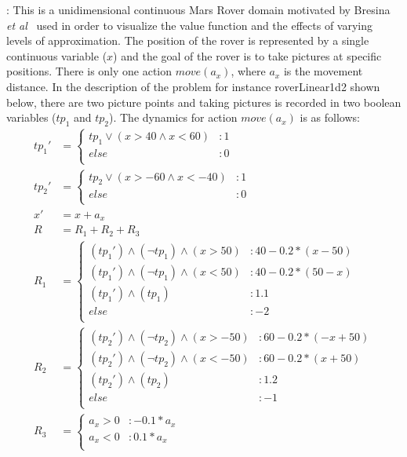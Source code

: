 \MarsRoverUni:
This is a unidimensional continuous Mars Rover domain motivated by
Bresina {\it et al}~\cite{bresina02} used in order to visualize the
value function and the effects of varying levels of approximation.
The position of the rover is represented by a single continuous
variable ($x$) and the goal of the rover is to take pictures at
specific positions.  There is only one action $\mathit{move}(a_x)$,
where $a_x$ is the movement distance. In the description of the
problem for instance roverLinear1d2 shown below, there are two picture
points and taking pictures is recorded in two boolean variables
($tp_1$ and $tp_2$). The dynamics for action $move(a_x)$ is as
follows: {\footnotesize
\begin{align*}
tp_1' &= \begin{cases}
tp_1 \vee (x>40 \wedge x<60)&: 1\\
else&: 0\\
\end{cases}\\
tp_2' &= \begin{cases}
tp_2 \vee (x>-60 \wedge x<-40)&: 1\\
else&: 0\\
\end{cases}\\
x' &=  x +a_x\\
R & = R_1 + R_2 + R_3\\
R_1 & = \begin{cases} 
(tp_1') \wedge (\neg tp_1) \wedge (x > 50) &: 40 - 0.2*(x -50)\\
(tp_1') \wedge (\neg tp_1) \wedge (x < 50) &: 40 - 0.2*(50-x)\\
(tp_1') \wedge ( tp_1) &:  1.1\\
else &: -2\\
\end{cases} \\
R_2 & = \begin{cases} 
(tp_2') \wedge (\neg tp_2) \wedge (x > -50) &: 60 - 0.2*(-x +50)\\
(tp_2') \wedge (\neg tp_2) \wedge (x < -50) &: 60 - 0.2*(x +50)\\
(tp_2') \wedge ( tp_2) &:  1.2\\
else &: -1\\
\end{cases} \\
R_3 & = \begin{cases} 
a_x > 0 &: -0.1*a_x\\
a_x < 0 &: 0.1*a_x\\
\end{cases} \\
\end{align*} }
\vspace{-10mm}

